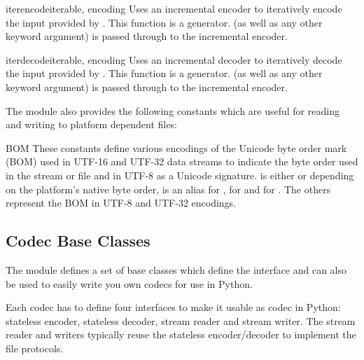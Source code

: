 \begin{funcdesc}{iterencode}{iterable, encoding}
Uses an incremental encoder to iteratively encode the input provided by
. This function is a generator.  (as well as
any other keyword argument) is passed through to the incremental encoder.
\end{funcdesc}

\begin{funcdesc}{iterdecode}{iterable, encoding}
Uses an incremental decoder to iteratively decode the input provided by
. This function is a generator.  (as well as
any other keyword argument) is passed through to the incremental encoder.
\end{funcdesc}

The module also provides the following constants which are useful
for reading and writing to platform dependent files:

\begin{datadesc}{BOM}
These constants define various encodings of the Unicode byte order mark
(BOM) used in UTF-16 and UTF-32 data streams to indicate the byte order
used in the stream or file and in UTF-8 as a Unicode signature.
 is either  or
 depending on the platform's native byte order,
 is an alias for , 
for  and  for .
The others represent the BOM in UTF-8 and UTF-32 encodings.
\end{datadesc}


\subsection{Codec Base Classes \label{codec-base-classes}}

The  module defines a set of base classes which define the
interface and can also be used to easily write you own codecs for use
in Python.

Each codec has to define four interfaces to make it usable as codec in
Python: stateless encoder, stateless decoder, stream reader and stream
writer. The stream reader and writers typically reuse the stateless
encoder/decoder to implement the file protocols.

